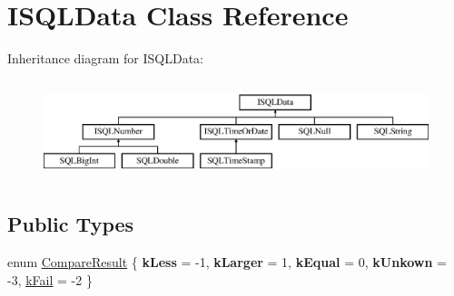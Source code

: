 \hypertarget{class_i_s_q_l_data}{}\section{I\+S\+Q\+L\+Data Class Reference}
\label{class_i_s_q_l_data}
Inheritance diagram for I\+S\+Q\+L\+Data\+:\begin{figure}[H]
\begin{center}
\leavevmode
\includegraphics[height=2.921739cm]{class_i_s_q_l_data}
\end{center}
\end{figure}
\subsection*{Public Types}
\begin{DoxyCompactItemize}
\item 
enum \mbox{\hyperlink{class_i_s_q_l_data_ac3f308048cf5362aba047c5c776c4f7b}{Compare\+Result}} \{ \newline
{\bfseries k\+Less} = -\/1, 
{\bfseries k\+Larger} = 1, 
{\bfseries k\+Equal} = 0, 
{\bfseries k\+Unkown} = -\/3, 
\newline
\mbox{\hyperlink{class_i_s_q_l_data_ac3f308048cf5362aba047c5c776c4f7ba46c1b2e071e8ff6a81eb9d0e600a8105}{k\+Fail}} = -\/2
 \}
\end{DoxyCompactItemize}
